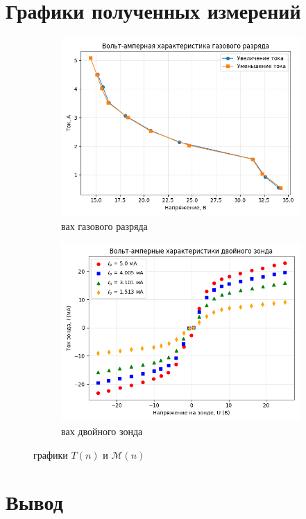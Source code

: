 \documentclass[a4paper, 12pt]{article}
\begin{document}
\section*{Графики полученных измерений}
\begin{figure}[htbp]
    \centering
    \begin{subfigure}{0.45\textwidth}
        \includegraphics[width=\linewidth]{vax.png}
        \caption{вах газового разряда}
        \label{вах газового разряда}
    \end{subfigure}
    \begin{subfigure}{0.45\textwidth}
        \includegraphics[width=\linewidth]{zond.png}
        \caption{вах двойного зонда}
        \label{вах двойного зонда}
    \end{subfigure}
    \caption{графики $T(n)$ и $\mathcal{M}(n)$}
    \label{графики моментов и периодов}
\end{figure}
\section*{Вывод}
\end{document}

